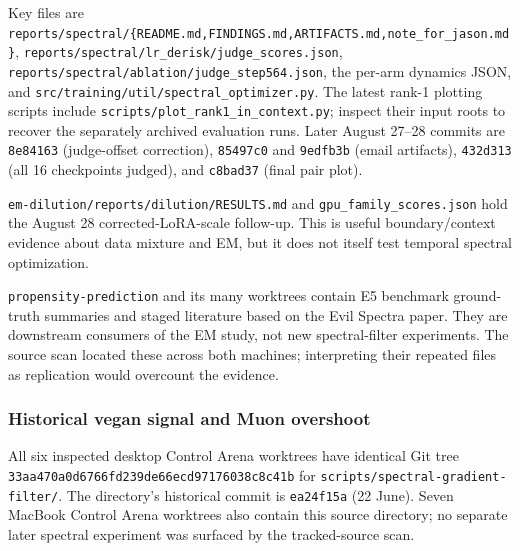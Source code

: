 \documentclass[
  british,
  10pt,
  a4paper,
]{article}
\begin{document}
Key files are
\texttt{reports/\allowbreak{}spectral/\allowbreak{}\{\allowbreak{}README.\allowbreak{}md,\allowbreak{}FINDINGS.\allowbreak{}md,\allowbreak{}ARTIFACTS.\allowbreak{}md,\allowbreak{}note\_\allowbreak{}for\_\allowbreak{}jason.\allowbreak{}md\}\allowbreak{}},
\texttt{reports/\allowbreak{}spectral/\allowbreak{}lr\_\allowbreak{}derisk/\allowbreak{}judge\_\allowbreak{}scores.\allowbreak{}json},
\texttt{reports/\allowbreak{}spectral/\allowbreak{}ablation/\allowbreak{}judge\_\allowbreak{}step564.\allowbreak{}json},
the per-arm dynamics JSON, and
\texttt{src/\allowbreak{}training/\allowbreak{}util/\allowbreak{}spectral\_\allowbreak{}optimizer.\allowbreak{}py}.
The latest rank-1 plotting scripts include
\texttt{scripts/\allowbreak{}plot\_\allowbreak{}rank1\_\allowbreak{}in\_\allowbreak{}context.\allowbreak{}py};
inspect their input roots to recover the separately archived evaluation
runs. Later August 27--28 commits are \texttt{8e84163}
(judge-\allowbreak{}offset correction),\allowbreak{} \texttt{85497c0}
and \texttt{9edfb3b} (email artifacts),\allowbreak{} \texttt{432d313}
(all 16 checkpoints judged), and \texttt{c8bad37} (final pair plot).

\texttt{em-\allowbreak{}dilution/\allowbreak{}reports/\allowbreak{}dilution/\allowbreak{}RESULTS.\allowbreak{}md}
and
\texttt{gpu\_\allowbreak{}family\_\allowbreak{}scores.\allowbreak{}json}
hold the August 28 corrected-\allowbreak{}LoRA-\allowbreak{}scale
follow-up. This is useful boundary/\allowbreak{}context evidence about
data mixture and EM, but it does not itself test temporal spectral
optimization\allowbreak{}.\allowbreak{}

\texttt{propensity-\allowbreak{}prediction} and its many worktrees
contain E5 benchmark ground-\allowbreak{}truth summaries and staged
literature based on the Evil Spectra paper. They are downstream
consumers of the EM study, not new spectral-\allowbreak{}filter
experiments.\allowbreak{} The source scan located these across both
machines; interpreting their repeated files as replication would
overcount the evidence.

\subsubsection{Historical vegan signal and Muon
overshoot}\label{repository-inventory--historical-vegan-signal-and-muon-overshoot}

All six inspected desktop Control Arena worktrees have identical Git
tree
\texttt{33aa470a0d67\allowbreak{}66fd239de66e\allowbreak{}cd97176038c8\allowbreak{}c41b}
for
\texttt{scripts/\allowbreak{}spectral-\allowbreak{}gradient-\allowbreak{}filter/\allowbreak{}}.
The directory's historical commit is \texttt{ea24f15a} (22 June). Seven
MacBook Control Arena worktrees also contain this source directory; no
separate later spectral experiment was surfaced by the
tracked-\allowbreak{}source scan.
\end{document}
